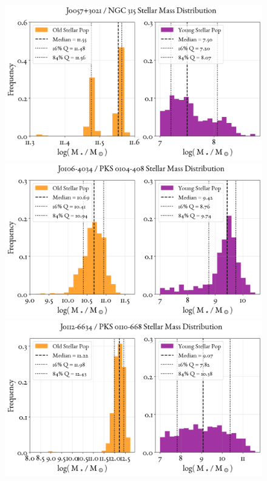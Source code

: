 \begin{figure}
    \centering
    \includegraphics[width=0.8\linewidth]{figures/ResultMasses/3_MassDistri_128.png}\\
    \includegraphics[width=0.8\linewidth]{figures/ResultMasses/5_MassDistri_145.png}\\
    \includegraphics[width=0.8\linewidth]{figures/ResultMasses/6_MassDistri_162.png}    
\end{figure}
